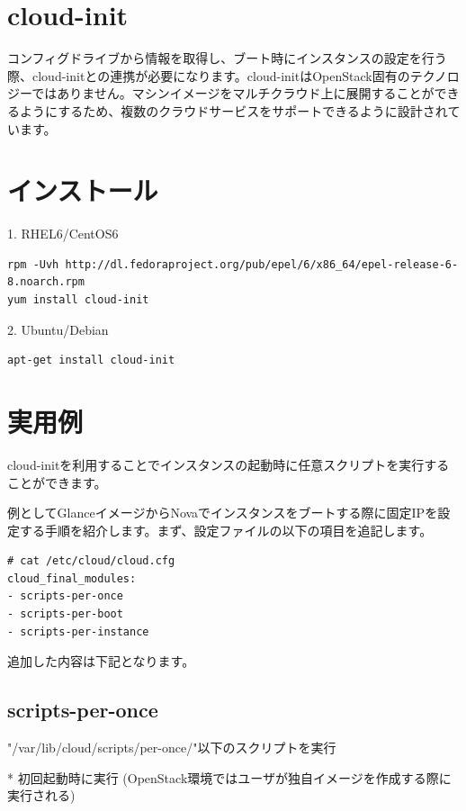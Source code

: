 \documentclass[8pt,b5paper,tombo,openany]{jsbook}
\begin{document}
\section{cloud-init}

コンフィグドライブから情報を取得し、ブート時にインスタンスの設定を行う際、cloud-initとの連携が必要になります。cloud-initはOpenStack固有のテクノロジーではありません。マシンイメージをマルチクラウド上に展開することができるようにするため、複数のクラウドサービスをサポートできるように設計されています。

\section{インストール}

1. RHEL6/CentOS6

\begin{lstlisting}
rpm -Uvh http://dl.fedoraproject.org/pub/epel/6/x86_64/epel-release-6-8.noarch.rpm
yum install cloud-init
\end{lstlisting}

2. Ubuntu/Debian

\begin{lstlisting}
apt-get install cloud-init
\end{lstlisting}

\section{実用例}

cloud-initを利用することでインスタンスの起動時に任意スクリプトを実行することができます。

例としてGlanceイメージからNovaでインスタンスをブートする際に固定IPを設定する手順を紹介します。まず、設定ファイルの以下の項目を追記します。

\begin{lstlisting}
# cat /etc/cloud/cloud.cfg
cloud_final_modules:
- scripts-per-once
- scripts-per-boot
- scripts-per-instance
\end{lstlisting}

追加した内容は下記となります。

\subsection{scripts-per-once}

"/var/lib/cloud/scripts/per-once/"以下のスクリプトを実行

* 初回起動時に実行 (OpenStack環境ではユーザが独自イメージを作成する際に実行される)
\end{document}
